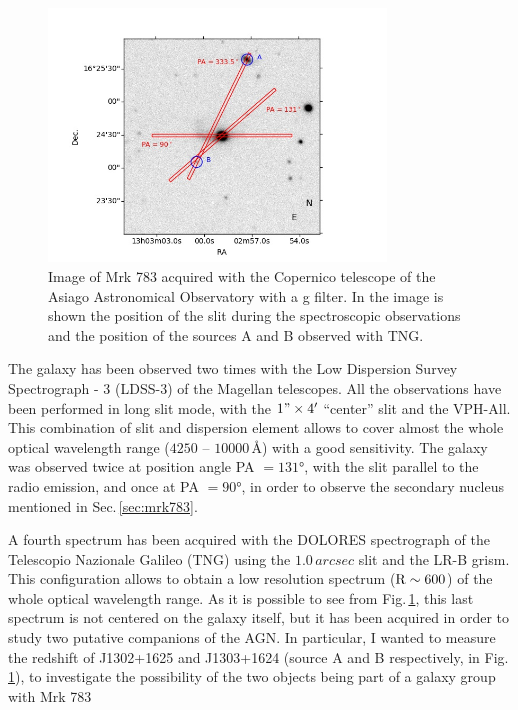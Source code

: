 \documentclass[../thesis.tex]{subfiles}
\begin{document}
\begin{figure}
\centering
\includegraphics[width=0.8\textwidth]{images/paper3/finding.jpg} 
\caption[]{Image of Mrk 783 acquired with the Copernico telescope of the Asiago Astronomical Observatory with a g filter. In the image is shown the position of the slit during the spectroscopic observations and the position of the sources A and B observed with TNG.}
\label{fig:finding_chart}
\end{figure}

The galaxy has been observed two times with the Low Dispersion Survey Spectrograph - 3 (LDSS-3) of the Magellan telescopes.
All the observations have been performed in long slit mode, with the $1"\times4'$ ``center'' slit and the VPH-All.
This combination of slit and dispersion element allows to cover almost the whole optical wavelength range ($4250$ -- $10000\,\si{\angstrom}$) with a good sensitivity.
The galaxy was observed twice at position angle PA $=\ang{131}$, with the slit parallel to the radio emission, and once at PA $=\ang{90}$, in order to observe the secondary nucleus mentioned in Sec.\,\ref{sec:mrk783}.

A fourth spectrum has been acquired with the DOLORES spectrograph of the Telescopio Nazionale Galileo (TNG) using the $1.0\,\si{arcsec}$ slit and the LR-B grism.
This configuration allows to obtain a low resolution spectrum (${\rm R}\sim 600$) of the whole optical wavelength range.
As it is possible to see from Fig.\,\ref{fig:finding_chart}, this last spectrum is not centered on the galaxy itself, but it has been acquired in order to study two putative companions of the AGN.
In particular, I wanted to measure the redshift of J1302+1625 and J1303+1624 (source A and B respectively, in Fig.\,\ref{fig:finding_chart}), to investigate the possibility of the two objects being part of a galaxy group with Mrk 783
\end{document}
